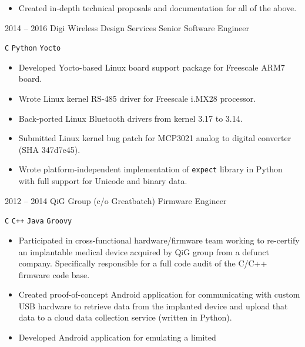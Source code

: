 \documentclass[10pt, letterpaper]{developercv}
\begin{document}
\begin{entrylist}
{\begin{itemize}[nosep]
                    Yocto builds automatically.
                \item Created in-depth technical proposals and documentation
                    for all of the above.
            \end{itemize}
        }
    \entry
        {2014 -- 2016}
        {Digi Wireless Design Services}
        {Senior Software Engineer}
        {%
            \texttt{C}\slashsep
            \texttt{Python}\slashsep
            \texttt{Yocto}
            \begin{itemize}[nosep]
                \item Developed Yocto-based Linux board support package for
                    Freescale ARM7 board.
                \item Wrote Linux kernel RS-485 driver for Freescale i.MX28
                    processor.
                \item Back-ported Linux Bluetooth drivers from kernel 3.17 to
                    3.14.
                \item Submitted Linux kernel bug patch for MCP3021 analog
                    to digital converter (SHA 347d7e45).
                \item Wrote platform-independent implementation of \texttt{expect}
                    library in Python with full support for Unicode and binary
                    data.
            \end{itemize}
        }
    \entry
        {2012 -- 2014}
        {QiG Group (c/o Greatbatch)}
        {Firmware Engineer}
        {%
            \texttt{C}\slashsep
            \texttt{C++}\slashsep
            \texttt{Java}\slashsep
            \texttt{Groovy}
            \begin{itemize}[nosep]
                \item Participated in cross-functional hardware/firmware team
                    working to re-certify an implantable medical device
                    acquired by QiG group from a defunct company. Specifically
                    responsible for a full code audit of the C/C++ firmware
                    code base.
                \item Created proof-of-concept Android application for
                    communicating with custom USB hardware to retrieve data
                    from the implanted device and upload that data to a cloud
                    data collection service (written in Python).
                \item Developed Android application for emulating a limited

\end{itemize}}
\end{entrylist}
\end{document}
